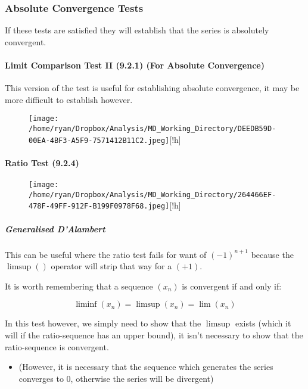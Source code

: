 \documentclass[
]{article}
\let\oldparagraph\paragraph
\renewcommand{\paragraph}[1]{\oldparagraph{#1}\mbox{}}
\let\oldsubparagraph\subparagraph
\renewcommand{\subparagraph}[1]{\oldsubparagraph{#1}\mbox{}}
\begin{document}
\hypertarget{header-n3253}{%
\subsubsection{Absolute Convergence Tests}\label{header-n3253}}

If these tests are satisfied they will establish that the series is
absolutely convergent.

\hypertarget{header-n3255}{%
\paragraph{Limit Comparison Test II (9.2.1) (For Absolute
Convergence)}\label{header-n3255}}

This version of the test is useful for establishing absolute
convergence, it may be more difficult to establish however.

\begin{figure}
\centering
\texttt{[image: /home/ryan/Dropbox/Analysis/MD\_Working\_Directory/DEEDB59D-00EA-4BF3-A5F9-7571412B11C2.jpeg]}[!h]
\caption{}
\end{figure}

\newpage
\hypertarget{header-n3259}{%
\paragraph{Ratio Test (9.2.4)}\label{header-n3259}}

\begin{figure}
\centering
\texttt{[image: /home/ryan/Dropbox/Analysis/MD\_Working\_Directory/264466EF-478F-49FF-912F-B199F0978F68.jpeg]}[!h]
\caption{}
\end{figure}

\hypertarget{header-n3261}{%
\subparagraph{Generalised D'Alambert}\label{header-n3261}}

This can be useful where the ratio test fails for want of \((-1)^{n+1}\)
because the \(\limsup()\) operator will strip that way for a \((+1)\).

It is worth remembering that a sequence \((x_n)\) is convergent if and
only if:

\[\liminf(x_n) = \limsup(x_n)=\lim(x_n)\]

In this test however, we simply need to show that the \(\limsup\) exists
(which it will if the ratio-sequence has an upper bound), it isn't
necessary to show that the ratio-sequence is convergent.

\begin{itemize}
\item
  (However, it is necessary that the sequence which generates the series
  converges to 0, otherwise the series will be divergent)
\end{itemize}
\end{document}
